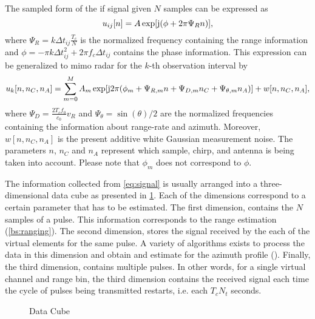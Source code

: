 The sampled form of the \ac{if} signal given $N$ samples can be expressed as
\begin{equation}
	u_{ij}[n] = A\exp[\mathrm{j}(\phi+2\pi\Psi_R n)]\\,
\end{equation}
where $\Psi_R = k\Delta t_{ij}\frac{T_c}{N} $ is the normalized frequency containing the range information and $\phi = -\pi k\Delta  t_{ij}^2 + 2\pi f_c \Delta t_{ij} $ contains the phase information. This expression can be generalized to \ac{mimo} radar for the $k$-th observation interval by
\begin{equation}\label{eq:signal}
	u_{k}[n,n_C,n_A] = \sum_{m=0}^{M}A_m\exp[\mathrm{j}2\pi(\phi_m+\Psi_{R,m}n+\Psi_{D,m}n_C+\Psi_{\theta,m}n_A)] + w[n,n_C,n_A]\\,
\end{equation}
where $\Psi_D = \frac{2T_cf_0}{c_0}v_R$ and $\Psi_\theta =\sin(\theta)/2 $ are the normalized frequencies containing the information about range-rate and azimuth. Moreover, $w[n,n_C,n_A]$ is the present additive white Gaussian measurement noise. The parameters $n$, $n_C$ and $n_A$ represent which sample, chirp, and antenna is being taken into account. Please note that $\phi_m$ does not correspond to $\phi$.

The information collected from \cref{eq:signal} is usually arranged into a three-dimensional data cube as presented in \cref{fig:datacube}. Each of the dimensions correspond to a certain parameter that has to be estimated. The first dimension, contains the $N$ samples of a pulse. This information corresponds to the range estimation (\cref{bs:ranging}). The second dimension, stores the signal received by the each of the virtual elements for the same pulse. A variety of algorithms exists to process the data in this dimension and obtain and estimate for the azimuth profile (). Finally, the third dimension, contains multiple pulses. In other words, for a single virtual channel and range bin, the third dimension contains the received signal each time the cycle of pulses being transmitted restarts, i.e. each $T_cN_t$ seconds. 

\begin{figure}[h]
	\centering
	
	\caption{Data Cube}
	\label{fig:datacube}
\end{figure} 

